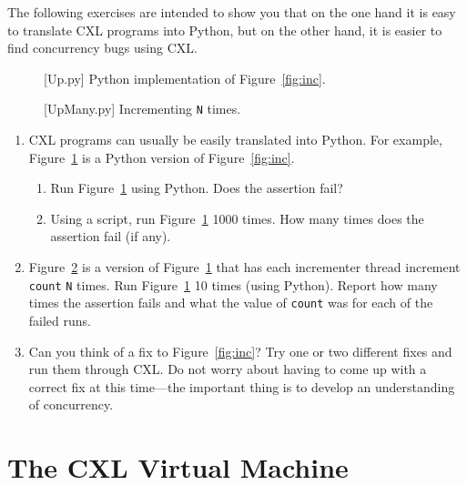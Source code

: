 \documentclass{report}
\newenvironment{code}{
\tcolorbox
}{
\endtcolorbox
}
\begin{document}
The following exercises are intended to show you that on the one hand it
is easy to translate CXL programs into Python, but on the other hand,
it is easier to find concurrency bugs using CXL.

\begin{figure}
\begin{code}
\end{code}
\caption{[Up.py] Python implementation of Figure~\ref{fig:inc}.}
\label{fig:incpy}
\end{figure}

\begin{figure}
\begin{code}
\end{code}
\caption{[UpMany.py] Incrementing \texttt{N} times.}
\label{fig:incmany}
\end{figure}

\begin{enumerate}
\item CXL programs can usually be easily translated into Python.  For example,
Figure~\ref{fig:incpy} is a Python version of Figure~\ref{fig:inc}.
\begin{enumerate}
\item Run Figure~\ref{fig:incpy} using Python.  Does the assertion fail?
\item Using a script, run Figure~\ref{fig:incpy} 1000 times.  How many times does the assertion
fail (if any).
\end{enumerate}
\item Figure~\ref{fig:incmany} is a version of Figure~\ref{fig:incpy} that has each
incrementer thread increment \texttt{count} \texttt{N} times.  Run Figure~\ref{fig:incpy}
10 times (using Python).
Report how many times the assertion fails and what the value of \texttt{count}
was for each of the failed runs.
\item Can you think of a fix to Figure~\ref{fig:inc}?  Try one or two different fixes
and run them through CXL.  Do not worry about having to come up with a correct fix at this
time---the important thing is to develop an understanding of concurrency.
\end{enumerate}

\chapter{The CXL Virtual Machine}
\label{ch:cxlmachine}
\end{document}
